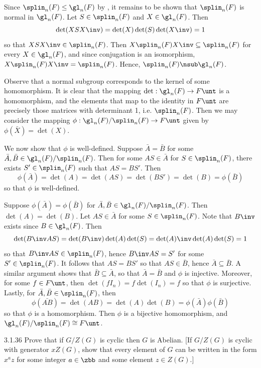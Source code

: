 \begin{sol}[spsol]
    Since $\splin_n(F) \leq \gl_n(F)$ by , it remains to be shown that $\splin_n(F)$ is normal in $\gl_n(F)$.
	Let $S \in \splin_n(F)$ and $X \in \gl_n(F)$.
	Then
    \[
    	\det(XSX\inv) = \det(X)\det(S)\det(X\inv) = 1
    \]
    so that $XSX\inv \in \splin_n(F)$.
	Then $X\splin_n(F)X\inv \subseteq \splin_n(F)$ for every $X \in \gl_n(F)$, and since conjugation is an isomorphism, $X\splin_n(F)X\inv = \splin_n(F)$.
	Hence, $\splin_n(F) \nsub \gl_n(F)$.

    Observe that a normal subgroup corresponds to the kernel of some homomorphism.
	It is clear that the mapping $\det : \gl_n(F) \to F\unt$ is a homomorphism, and the elements that map to the identity in $F\unt$ are precisely those matrices with determinant 1, i.e. $\splin_n(F)$.
	Then we may consider the mapping $\phi : \gl_n(F)/\splin_n(F) \to F\unt$ given by $\phi(\bar X) = \det(X)$.

    We now show that $\phi$ is well-defined.
	Suppose $\bar A = \bar B$ for some $\bar A, \bar B \in \gl_n(F)/\splin_n(F)$.
	Then for some $AS \in \bar A$ for $S \in \splin_n(F)$, there exists $S' \in \splin_n(F)$ such that $AS = BS'$.
	Then
    \[
    	\phi(\bar A) = \det(A) = \det(AS) = \det(BS') = \det(B) = \phi(\bar B)
    \]
    so that $\phi$ is well-defined.

    Suppose $\phi(\bar A) = \phi(\bar B)$ for $\bar A, \bar B \in \gl_n(F)/\splin_n(F)$.
	Then $\det(A) = \det(B)$.
	Let $AS \in \bar A$ for some $S \in \splin_n(F)$.
	Note that $B\inv$ exists since $B \in \gl_n(F)$.
	Then
    \[
    	\det(B\inv AS) = \det(B\inv)\det(A)\det(S) = \det(A)\inv\det(A)\det(S) = 1
    \]
    so that $B\inv AS \in \splin_n(F)$, hence $B\inv AS = S'$ for some $S' \in \splin_n(F)$.
	It follows that $AS = BS'$ so that $AS \in \bar B$, hence $\bar A \subseteq \bar B$.
	A similar argument shows that $\bar B \subseteq \bar A$, so that $\bar A = \bar B$ and $\phi$ is injective.
	Moreover, for some $f \in F\unt$, then $\det(fI_n) = f\det(I_n) = f$ so that $\phi$ is surjective.
	Lastly, for $\bar A, \bar B \in \splin_n(F)$, then
    \[
    	\phi(\bar{AB}) = \det(AB) = \det(A)\det(B) = \phi(\bar A)\phi(\bar B)
    \]
    so that $\phi$ is a homomorphism.
	Then $\phi$ is a bijective homomorphism, and $\gl_n(F)/\splin_n(F) \cong F\unt$.
\end{sol}

\begin{exercise}{3.1.36} 
    Prove that if $G/Z(G)$ is cyclic then $G$ is Abelian. [If $G/Z(G)$ is cyclic with generator $xZ(G)$, show that every element of $G$ can be written in the form $x^a z$ for some integer $a \in \zbb$ and some element $z \in Z(G)$.]
\end{exercise}

